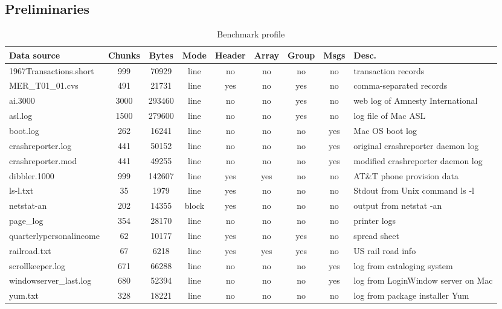 \subsection{Preliminaries}
\begin{table*}
\begin{center}
\begin{tabular}{|l|c|c|c|c|c|c|c|l|} \hline
Data source	& Chunks & Bytes	& Mode  &Header	& Array	& Group & Msgs 	& Desc. \\ \hline \hline
1967Transactions.short	& 999	& 70929	& line	& no	& no	& no	& no	& transaction records \\ \hline
MER\_T01\_01.cvs	& 491	& 21731 & line  & yes	& no	& yes	& no	& comma-separated records\\ \hline
ai.3000		& 3000		& 293460& line	& no	& no	& yes	& no	& web log of Amnesty International \\ \hline
asl.log &	1500	& 279600	& line	& no	& no	& yes	& no	& log file of Mac ASL \\ \hline	
boot.log	& 262	& 16241		& line	& no	& no	& no	& yes	& Mac OS boot log \\ \hline
crashreporter.log & 441	& 50152 	& line	& no	& no	& no	& yes	& original crashreporter daemon log \\ \hline
crashreporter.mod & 441	& 49255		& line	& no	& no	& no	& yes	& modified crashreporter daemon log \\ \hline
dibbler.1000	& 999	& 142607 	& line	& yes	& yes	& no	& no	& AT\&T phone provision data \\ \hline
ls-l.txt	& 35	& 1979		& line	& yes	& no	& no	& no	& Stdout from Unix command ls -l \\ \hline
netstat-an	& 202	& 14355		& block	& yes	& no	& no	& no	& output from netstat -an \\ \hline
page\_log	& 354	& 28170		& line	& no	& no	& no	& no	& printer logs \\ \hline
quarterlypersonalincome & 62	& 10177	& line	& yes	& no	& yes	& no	& spread sheet \\ \hline
railroad.txt	& 67	& 6218		& line	& yes	& yes	& yes	& no	& US rail road info \\ \hline
scrollkeeper.log & 671	& 66288		& line	& no	& no	& no	& yes	& log from cataloging system \\ \hline
windowserver\_last.log & 680	& 52394	& line	& no	& no	& no	& yes	& log from LoginWindow server on Mac \\ \hline
yum.txt		& 328	& 18221		& line	& no	& no	& no	& no	& log from package installer Yum \\ \hline
\end{tabular}
\caption{Benchmark profile} \label{tab:benchmarks}
\end{center}
\end{table*}

